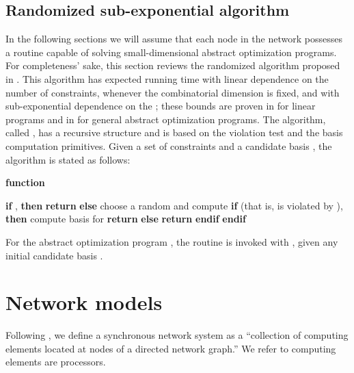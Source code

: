 \documentclass[onecolumn,journal,letterpaper]{IEEEtran}
\begin{document}
\subsection{Randomized sub-exponential algorithm}
In the following sections we will assume that each node in the network
possesses a routine capable of solving small-dimensional abstract
optimization programs. For completeness' sake, this section reviews the
randomized algorithm proposed in \cite{JM-MS-EW:96}. This algorithm has
expected running time with linear dependence on the number of constraints,
whenever the combinatorial dimension  is fixed, and with
sub-exponential dependence on the ; these bounds are proven in
\cite{JM-MS-EW:96} for linear programs and in \cite{BG-EW:96} for general
abstract optimization programs.
The algorithm, called , has a recursive structure and is based on
the violation test and the basis computation primitives.  Given a set of
constraints  and a candidate basis , the algorithm is
stated as follows:
\begin{center}
\begin{minipage}[c]{.9\textwidth}
\textbf{function} 
\begin{algorithmic}[1]
\STATE \textbf{if} , \textbf{then} \textbf{return} 
\STATE \textbf{else}
\STATE \quad choose a random  and
compute 
\STATE \quad \textbf{if} {  (that is,  is violated by
  ),} \textbf{then}
\STATE \quad \quad compute  basis for 
\STATE \quad \quad \textbf{return} 
\STATE \quad \textbf{else} \textbf{return} 
\STATE \quad \textbf{endif}
\STATE \textbf{endif}
\end{algorithmic}
\end{minipage}
\end{center}

\noindent For the abstract optimization program , the routine is
invoked with , given any initial candidate basis .



\section{Network models}
\label{sec:network-modeling}
Following \cite{NAL:97}, we define a synchronous network system as a
``collection of computing elements located at nodes of a directed network
graph.''  We refer to computing elements are processors.
\end{document}
